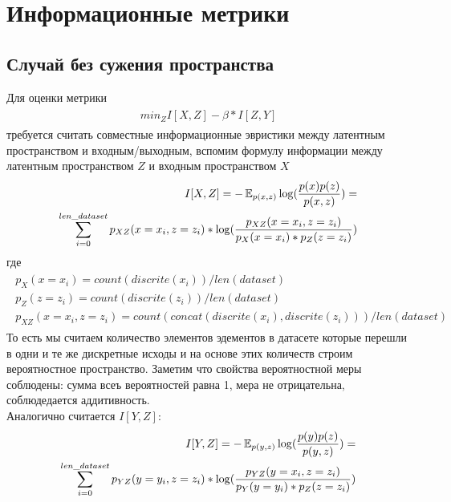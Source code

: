 \section{Информационные метрики}
\subsection{Случай без сужения пространства}
Для оценки метрики 
\begin{gather}
\begin{aligned}
min_{Z} I[X, Z] - \beta * I[Z, Y]
\end{aligned}
\end{gather} 
требуется считать совместные информационные эвристики между латентным пространством и входным/выходным, вспомим формулу информации между латентным пространством $Z$ и входным пространством $X$
\begin{gather}
\begin{aligned}
    I[X, Z] = - \operatorname{\mathbb{E}}_{p(x, z)}\log(\frac{p(x)p(z)}{p(x, z)}) = \\ \sum_{i=0}^{len\_dataset}p_{XZ}(x=x_i, z=z_i) * \log(\frac{p_{XZ}(x=x_i, z=z_i)}{p_X(x=x_i) * p_Z(z=z_i)})
\end{aligned}
\end{gather}    
где 
\begin{gather}
\begin{aligned}
p_X(x=x_i) = count(discrite(x_i)) / len(dataset) \\
p_Z(z=z_i) = count(discrite(z_i)) / len(dataset) \\
p_{XZ}(x=x_i, z=z_i) = count(concat(discrite(x_i), discrite(z_i))) / len(dataset) 
\end{aligned}
\end{gather}
То есть мы считаем количество элементов эдементов в датасете которые перешли в одни и те же дискретные исходы и на основе этих количеств строим вероятностное пространство. Заметим что свойства вероятностной меры соблюдены: сумма всеъ вероятностей равна 1, мера не отрицательна, соблюдедается аддитивность. \\
Аналогично считается $I[Y, Z]$:
\begin{gather}
\begin{aligned}
    I[Y, Z] = - \operatorname{\mathbb{E}}_{p(y, z)}\log(\frac{p(y)p(z)}{p(y, z)}) = \\ \sum_{i=0}^{len\_dataset}p_{YZ}(y=y_i, z=z_i) * \log(\frac{p_{YZ}(y=x_i, z=z_i)}{p_Y(y=y_i) * p_Z(z=z_i)})
\end{aligned}
\end{gather} 
